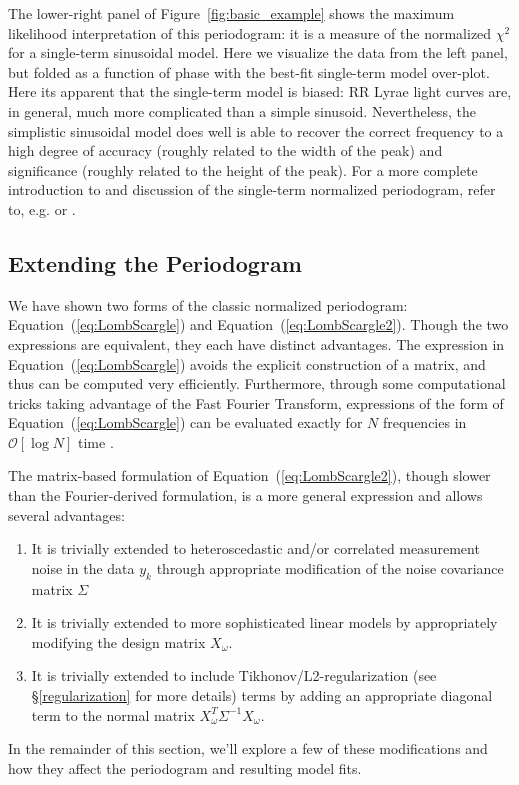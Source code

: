 \documentclass[12pt,preprint]{aastex}
\newcommand{\Fig}[1]{Figure~\ref{fig:#1}}
\newcommand{\fig}[1]{\Fig{#1}}
\newcommand{\Eq}[1]{Equation~(\ref{eq:#1})}
\newcommand{\eq}[1]{\Eq{#1}}
\begin{document}
The lower-right panel of \fig{basic_example} shows the maximum likelihood interpretation of this periodogram: it is a measure of the normalized $\chi^2$ for a single-term sinusoidal model. Here we visualize the data from the left panel, but folded as a function of phase with the best-fit single-term model over-plot. Here its apparent that the single-term model is biased: RR Lyrae light curves are, in general, much more complicated than a simple sinusoid. Nevertheless, the simplistic sinusoidal model does well is able to recover the correct frequency to a high degree of accuracy (roughly related to the width of the peak) and significance (roughly related to the height of the peak). For a more complete introduction to and discussion of the single-term normalized periodogram, refer to, e.g. \citet{Bretthorst88} or \citet{ICVG2014}.

\subsection{Extending the Periodogram}
We have shown two forms of the classic normalized periodogram: \eq{LombScargle} and \eq{LombScargle2}. Though the two expressions are equivalent, they each have distinct advantages. The expression in \eq{LombScargle} avoids the explicit construction of a matrix, and thus can be computed very efficiently. Furthermore, through some computational tricks taking advantage of the Fast Fourier Transform, expressions of the form of \eq{LombScargle} can be evaluated exactly for $N$ frequencies in $\mathcal{O}[\log{N}]$ time \citep{Press89}.

The matrix-based formulation of \eq{LombScargle2}, though slower than the Fourier-derived formulation, is a more general expression and allows several advantages:
\begin{enumerate}
  \item It is trivially extended to heteroscedastic and/or correlated measurement noise in the data $y_k$ through appropriate modification of the noise covariance matrix $\Sigma$
  \item It is trivially extended to more sophisticated linear models by appropriately modifying the design matrix $X_\omega$.
  \item It is trivially extended to include Tikhonov/L2-regularization (see \S \ref{regularization} for more details)  terms by 
               adding an appropriate diagonal term to the normal matrix $X_\omega^T\Sigma^{-1}X_\omega$.
\end{enumerate}
In the remainder of this section, we'll explore a few of these modifications and how they affect the periodogram and resulting model fits.
\end{document}
